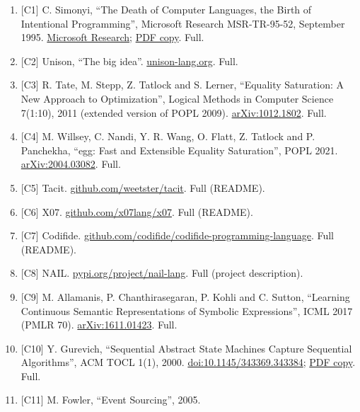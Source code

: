\documentclass[10pt,letterpaper]{article}
\providecommand{\tightlist}{\setlength{\itemsep}{1pt}\setlength{\parskip}{0pt}}
\begin{document}
\begin{enumerate}
\def\labelenumi{\arabic{enumi}.}
\tightlist
\item
  {[}C1{]} C. Simonyi, ``The Death of Computer Languages, the Birth of
  Intentional Programming'', Microsoft Research MSR-TR-95-52, September
  1995.
  \href{https://www.microsoft.com/en-us/research/publication/the-death-of-computer-languages-the-birth-of-intentional-programming/}{Microsoft
  Research};
  \href{https://uni.r-brause.de/seminare/SemSS07/simonyi95death.pdf}{PDF
  copy}. Full.
\item
  {[}C2{]} Unison, ``The big idea''.
  \href{https://www.unison-lang.org/docs/the-big-idea/}{unison-lang.org}.
  Full.
\item
  {[}C3{]} R. Tate, M. Stepp, Z. Tatlock and S. Lerner, ``Equality
  Saturation: A New Approach to Optimization'', Logical Methods in
  Computer Science 7(1:10), 2011 (extended version of POPL 2009).
  \href{https://arxiv.org/abs/1012.1802}{arXiv:1012.1802}. Full.
\item
  {[}C4{]} M. Willsey, C. Nandi, Y. R. Wang, O. Flatt, Z. Tatlock and P.
  Panchekha, ``egg: Fast and Extensible Equality Saturation'', POPL
  2021. \href{https://arxiv.org/abs/2004.03082}{arXiv:2004.03082}. Full.
\item
  {[}C5{]} Tacit.
  \href{https://github.com/weetster/tacit}{github.com/weetster/tacit}.
  Full (README).
\item
  {[}C6{]} X07.
  \href{https://github.com/x07lang/x07}{github.com/x07lang/x07}. Full
  (README).
\item
  {[}C7{]} Codifide.
  \href{https://github.com/codifide/codifide-programming-language}{github.com/codifide/codifide-programming-language}.
  Full (README).
\item
  {[}C8{]} NAIL.
  \href{https://pypi.org/project/nail-lang/}{pypi.org/project/nail-lang}.
  Full (project description).
\item
  {[}C9{]} M. Allamanis, P. Chanthirasegaran, P. Kohli and C. Sutton,
  ``Learning Continuous Semantic Representations of Symbolic
  Expressions'', ICML 2017 (PMLR 70).
  \href{https://arxiv.org/abs/1611.01423}{arXiv:1611.01423}. Full.
\item
  {[}C10{]} Y. Gurevich, ``Sequential Abstract State Machines Capture
  Sequential Algorithms'', ACM TOCL 1(1), 2000.
  \href{https://doi.org/10.1145/343369.343384}{doi:10.1145/343369.343384};
  \href{https://www.cs.tau.ac.il/~nachumd/models/gurevich.pdf}{PDF
  copy}. Full.
\item
  {[}C11{]} M. Fowler, ``Event Sourcing'', 2005.

\end{enumerate}
\end{document}
